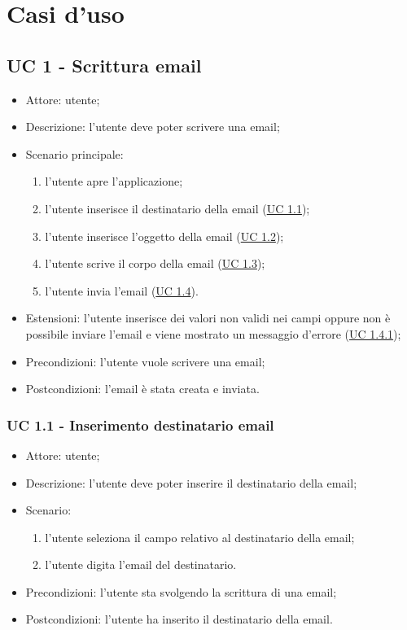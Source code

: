 \section{Casi d'uso}

    \subsection{UC 1 - Scrittura email} \label{sec: 1}
    \begin{itemize}
        \item Attore: utente;
        \item Descrizione: l'utente deve poter scrivere una email;
        \item Scenario principale:
            \begin{enumerate}
            \item l’utente apre l’applicazione;
            \item l'utente inserisce il destinatario della email (\hyperref[sec: UC 1.1]{UC 1.1});
            \item l'utente inserisce l'oggetto della email (\hyperref[sec: UC 1.2]{UC 1.2});
            \item l’utente scrive il corpo della email (\hyperref[sec: UC 1.3]{UC 1.3});
            \item l’utente invia l'email (\hyperref[sec: UC 1.4]{UC 1.4}).
            \end{enumerate}
        \item Estensioni: l'utente inserisce dei valori non validi nei campi oppure non è possibile inviare l'email e viene mostrato un messaggio d'errore (\hyperref[sec: UC 1.4.1]{UC 1.4.1});
        \item Precondizioni: l'utente vuole scrivere una email;
        \item Postcondizioni: l'email è stata creata e inviata.
    \end{itemize}

    \subsubsection{UC 1.1 - Inserimento destinatario email} \label{sec: UC 1.1}
    \begin{itemize}
        \item Attore: utente;
        \item Descrizione: l'utente deve poter inserire il destinatario della email;
        \item Scenario:
        \begin{enumerate}
        \item l'utente seleziona il campo relativo al destinatario della email;
        \item l'utente digita l'email del destinatario.
        \end{enumerate}
        \item Precondizioni: l'utente sta svolgendo la scrittura di una email;
        \item Postcondizioni: l'utente ha inserito il destinatario della email.
    \end{itemize}

